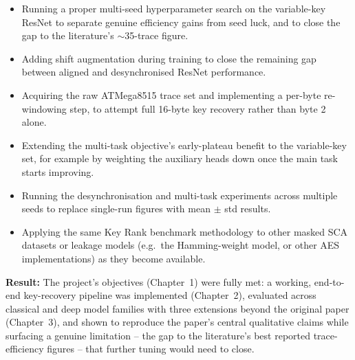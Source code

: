 \begin{itemize}
\item Running a proper multi-seed hyperparameter search on the variable-key ResNet
      to separate genuine efficiency gains from seed luck, and to close the gap to
      the literature's $\sim$35-trace figure.
\item Adding shift augmentation during training to close the remaining gap between
      aligned and desynchronised ResNet performance.
\item Acquiring the raw ATMega8515 trace set and implementing a per-byte
      re-windowing step, to attempt full 16-byte key recovery rather than byte 2
      alone.
\item Extending the multi-task objective's early-plateau benefit to the
      variable-key set, for example by weighting the auxiliary heads down once the
      main task starts improving.
\item Running the desynchronisation and multi-task experiments across multiple
      seeds to replace single-run figures with mean $\pm$ std results.
\item Applying the same Key Rank benchmark methodology to other masked SCA datasets
      or leakage models (e.g.\ the Hamming-weight model, or other AES
      implementations) as they become available.
\end{itemize}

\textbf{Result:} The project's objectives (Chapter~1) were fully met: a working,
end-to-end key-recovery pipeline was implemented (Chapter~2), evaluated across
classical and deep model families with three extensions beyond the original paper
(Chapter~3), and shown to reproduce the paper's central qualitative claims while
surfacing a genuine limitation -- the gap to the literature's best reported
trace-efficiency figures -- that further tuning would need to close.
